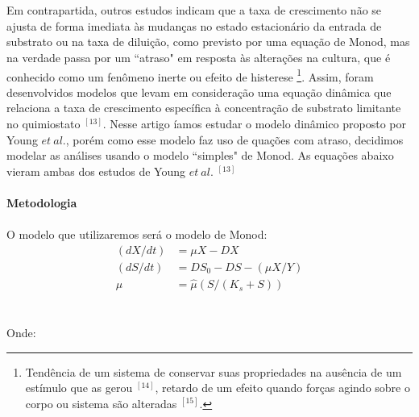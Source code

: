 \documentclass{article}
\begin{document}
\\\\Em contrapartida, outros estudos indicam que a taxa de crescimento não se ajusta de forma imediata às mudanças no estado estacionário da entrada de substrato ou na taxa de diluição, como previsto por uma equação de Monod, mas na verdade passa por um ``atraso" em resposta às alterações na cultura, que é conhecido como um fenômeno inerte ou efeito de histerese \footnote{Tendência de um sistema de conservar suas propriedades na ausência de um estímulo que as gerou $^{[14]}$, retardo de um efeito quando forças agindo sobre o corpo ou sistema são alteradas $^{[15]}$.}. Assim, foram desenvolvidos modelos que levam em consideração uma equação dinâmica que relaciona a taxa de crescimento específica à concentração de substrato limitante no quimiostato $^{[13]}$. Nesse artigo íamos estudar o modelo dinâmico proposto por Young $et \ al.$, porém como esse modelo faz uso de quações com atraso, decidimos modelar as análises usando o modelo ``simples" de Monod. As equações abaixo vieram ambas dos estudos de  Young $et \ al. $ $^{[13]}$ 
\\\\
\textbf{\Large{Metodologia}}
\\\\O modelo que utilizaremos será o modelo de Monod:
\begin{align}
    (dX/dt) &= \mu X-DX     
  \\(dS/dt) &= DS_0-DS-(\mu X/Y)
  \\\mu &= \hat{\mu}(S/(K_s+S))
\end{align}
\\\\Onde:
\end{document}
